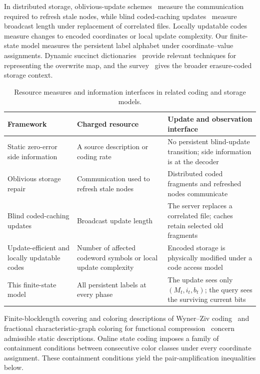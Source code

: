 \documentclass[11pt,a4paper]{article}
\begin{document}
In distributed storage, oblivious-update schemes~\cite{nakkiran2014} measure the communication required to refresh stale nodes, while blind coded-caching updates~\cite{ghosh2021} measure broadcast length under replacement of correlated files. Locally updatable codes~\cite{mazumdar2012,mazumdar2014,chandran2014} measure changes to encoded coordinates or local update complexity. Our finite-state model measures the persistent label alphabet under coordinate--value assignments. Dynamic succinct dictionaries~\cite{li2023,domingues2026} provide relevant techniques for representing the overwrite map, and the survey~\cite{shen2025} gives the broader erasure-coded storage context.

\begin{table}[htbp]\centering\small
\begin{tabular}{@{}p{28mm}p{46mm}p{55mm}@{}}\toprule
Framework & Charged resource & Update and observation interface\\\midrule
Static zero-error side information~\cite{witsenhausen1976,koulgi2003} & A source description or coding rate & No persistent blind-update transition; side information is at the decoder\\
Oblivious storage repair~\cite{nakkiran2014} & Communication used to refresh stale nodes & Distributed coded fragments and refreshed nodes communicate\\
Blind coded-caching updates~\cite{ghosh2021} & Broadcast update length & The server replaces a correlated file; caches retain selected old fragments\\
Update-efficient and locally updatable codes~\cite{mazumdar2014,chandran2014} & Number of affected codeword symbols or local update complexity & Encoded storage is physically modified under a code access model\\
This finite-state model & All persistent labels at every phase & The update sees only $(M_t,i_t,b_t)$; the query sees the surviving current bits\\\bottomrule
\end{tabular}
\caption{Resource measures and information interfaces in related coding and storage models.}\label{tab:interfaces}
\end{table}

Finite-blocklength covering and coloring descriptions of Wyner--Ziv coding~\cite{matsuta2022} and fractional characteristic-graph coloring for functional compression~\cite{malak2022} concern admissible static descriptions. Online state coding imposes a family of containment conditions between consecutive color classes under every coordinate assignment. These containment conditions yield the pair-amplification inequalities below.
\end{document}

